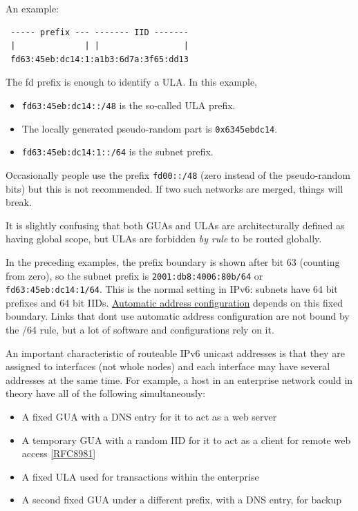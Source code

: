 \documentclass[
]{article}
\providecommand{\tightlist}{%
  \setlength{\itemsep}{0pt}\setlength{\parskip}{0pt}}
\begin{document}
An example:

\begin{verbatim}
 ----- prefix --- ------- IID -------
 |              | |                 |
 fd63:45eb:dc14:1:a1b3:6d7a:3f65:dd13
\end{verbatim}

The \textquotesingle fd\textquotesingle{} prefix is enough to identify a
ULA. In this example,

\begin{itemize}
\tightlist
\item
  \texttt{fd63:45eb:dc14::/48} is the so-called ULA prefix.
\item
  The locally generated pseudo-random part is \texttt{0x6345ebdc14}.
\item
  \texttt{fd63:45eb:dc14:1::/64} is the subnet prefix.
\end{itemize}

Occasionally people use the prefix \texttt{fd00::/48} (zero instead of
the pseudo-random bits) but this is not recommended. If two such
networks are merged, things will break.

It is slightly confusing that both GUAs and ULAs are architecturally
defined as having \textquotesingle global scope\textquotesingle, but
ULAs are forbidden \emph{by rule} to be routed globally.

In the preceding examples, the prefix boundary is shown after bit 63
(counting from zero), so the subnet prefix is
\texttt{2001:db8:4006:80b/64} or \texttt{fd63:45eb:dc14:1/64}. This is
the normal setting in IPv6: subnets have 64 bit prefixes and 64 bit
IIDs. \hyperref[auto-configuration]{Automatic address configuration}
depends on this fixed boundary. Links that don\textquotesingle t use
automatic address configuration are not bound by the /64 rule, but a lot
of software and configurations rely on it.

An important characteristic of routeable IPv6 unicast addresses is that
they are assigned to interfaces (not whole nodes) and each interface may
have several addresses at the same time. For example, a host in an
enterprise network could in theory have all of the following
simultaneously:

\begin{itemize}
\tightlist
\item
  A fixed GUA with a DNS entry for it to act as a web server
\item
  A temporary GUA with a random IID for it to act as a client for remote
  web access
  {[}\href{https://www.rfc-editor.org/info/rfc8981}{RFC8981}{]}
\item
  A fixed ULA used for transactions within the enterprise
\item
  A second fixed GUA under a different prefix, with a DNS entry, for
  backup
\end{itemize}
\end{document}
